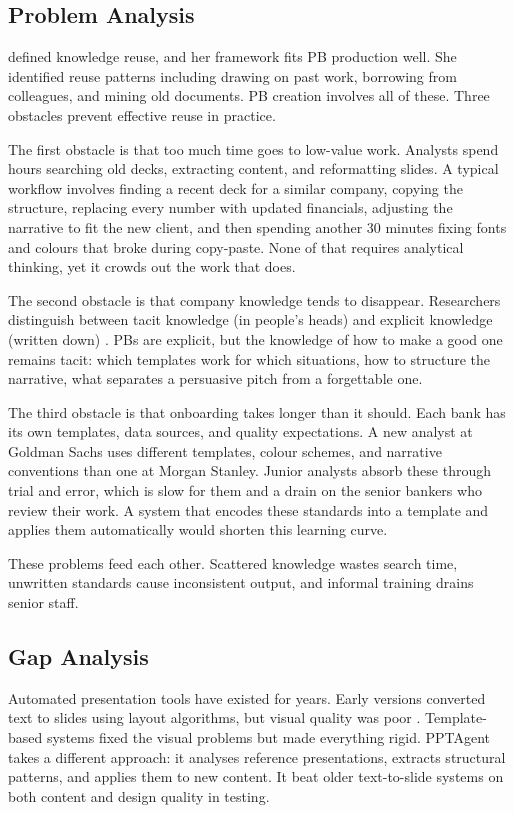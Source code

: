 \subsection{Problem Analysis}

\textcite{markus2001} defined knowledge reuse, and her framework fits PB production well. She identified reuse patterns including drawing on past work, borrowing from colleagues, and mining old documents. PB creation involves all of these. Three obstacles prevent effective reuse in practice.

The first obstacle is that too much time goes to low-value work. Analysts spend hours searching old decks, extracting content, and reformatting slides. A typical workflow involves finding a recent deck for a similar company, copying the structure, replacing every number with updated financials, adjusting the narrative to fit the new client, and then spending another 30 minutes fixing fonts and colours that broke during copy-paste. None of that requires analytical thinking, yet it crowds out the work that does.

The second obstacle is that company knowledge tends to disappear. Researchers distinguish between tacit knowledge (in people's heads) and explicit knowledge (written down) \parencite{dalkir2011}. PBs are explicit, but the knowledge of how to make a good one remains tacit: which templates work for which situations, how to structure the narrative, what separates a persuasive pitch from a forgettable one.

The third obstacle is that onboarding takes longer than it should. Each bank has its own templates, data sources, and quality expectations. A new analyst at Goldman Sachs uses different templates, colour schemes, and narrative conventions than one at Morgan Stanley. Junior analysts absorb these through trial and error, which is slow for them and a drain on the senior bankers who review their work. A system that encodes these standards into a template and applies them automatically would shorten this learning curve.

These problems feed each other. Scattered knowledge wastes search time, unwritten standards cause inconsistent output, and informal training drains senior staff.

\subsection{Gap Analysis}

Automated presentation tools have existed for years. Early versions converted text to slides using layout algorithms, but visual quality was poor \parencite{zheng2025}. Template-based systems fixed the visual problems but made everything rigid. PPTAgent \parencite{zheng2025} takes a different approach: it analyses reference presentations, extracts structural patterns, and applies them to new content. It beat older text-to-slide systems on both content and design quality in testing.

